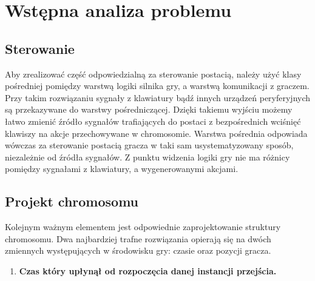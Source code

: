 \section{Wstępna analiza problemu}
\begin{par}
	\subsection{Sterowanie}
	\begin{par}
	Aby zrealizować część odpowiedzialną za sterowanie postacią, należy użyć klasy pośredniej pomiędzy warstwą logiki silnika gry, a warstwą komunikacji z graczem.
	Przy takim rozwiązaniu sygnały z klawiatury bądź innych urządzeń peryferyjnych są przekazywane do warstwy pośredniczącej.
	Dzięki takiemu wyjściu możemy łatwo zmienić źródło sygnałów trafiających do postaci z bezpośrednich wciśnięć klawiszy na akcje przechowywane w chromosomie.
	Warstwa pośrednia odpowiada wówczas za sterowanie postacią gracza w taki sam usystematyzowany sposób, niezależnie od źródła sygnałów. 
	Z punktu widzenia logiki gry nie ma różnicy pomiędzy sygnałami z klawiatury, a wygenerowanymi akcjami.
	\end{par}
	
	\subsection{Projekt chromosomu}
	Kolejnym ważnym elementem jest odpowiednie zaprojektowanie struktury chromosomu. 
	Dwa najbardziej trafne rozwiązania opierają się na dwóch zmiennych występujących w środowisku gry: czasie oraz pozycji gracza.
	\begin{enumerate}
	\item
	{\bf Czas który upłynął od rozpoczęcia danej instancji przejścia. }
	\begin{par}


\end{par}
\end{enumerate}
\end{par}
